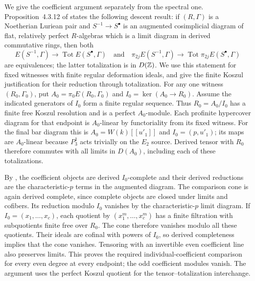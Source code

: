 We give the coefficient argument separately from the spectral one.
Proposition~4.3.12 of \cite{BMR2026} states the following descent result:
if $(R,\Gamma)$ is a Noetherian Luriean pair and
$S^{-1}\to S^{\bullet}$ is an augmented cosimplicial diagram of flat,
relatively perfect $R$-algebras which is a limit diagram in derived
commutative rings, then both
\[
 E(S^{-1},\Gamma)\longrightarrow
       \operatorname{Tot} E(S^{\bullet},\Gamma)
 \quad\text{and}\quad
 \pi_{2j}E(S^{-1},\Gamma)\longrightarrow
       \operatorname{Tot}\pi_{2j}E(S^{\bullet},\Gamma)
\]
are equivalences; the latter totalization is in $D(\mathbb Z)$.
We use this statement for fixed witnesses with finite regular deformation
ideals, and give the finite Koszul justification for their reduction
through totalization.
For any one witness $(R_0,\Gamma_0)$, put
$A_0=\pi_0E(R_0,\Gamma_0)$ and $I_0=\ker(A_0\to R_0)$.
Assume the indicated generators of $I_0$ form a finite regular sequence.
Thus $R_0=A_0/I_0$ has a finite free Koszul resolution and is a perfect
$A_0$-module. Each profinite hypercover diagram for that endpoint is
$A_0$-linear by functoriality from its fixed witness. For the final bar diagram this is
$A_0=W(k)[[u'_1]]$ and $I_0=(p,u'_1)$; its maps are $A_0$-linear
because $P_3^1$ acts trivially on the $E_2$ source.
Derived tensor with $R_0$ therefore commutes with all limits in
$D(A_0)$, including each of these totalizations.

By \cite[Lemma~4.2.12]{BMR2026}, the coefficient objects are derived
$I_0$-complete and their derived reductions are the characteristic-$p$
terms in the augmented diagram. The comparison cone is again derived
complete, since complete objects are closed under limits and cofibers.
Its reduction modulo $I_0$ vanishes by the characteristic-$p$ limit
diagram. If $I_0=(x_1,\ldots,x_c)$, each quotient by
$(x_1^m,\ldots,x_c^m)$ has a finite filtration with subquotients finite
free over $R_0$. The cone therefore vanishes modulo all these quotients.
Their ideals are cofinal with powers of $I_0$, so derived completeness
implies that the cone vanishes. Tensoring with an invertible even
coefficient line also preserves limits. This proves the required
individual-coefficient comparison for every even degree at every
endpoint; the odd coefficient modules vanish. The argument uses the
perfect Koszul quotient for the tensor--totalization interchange.

